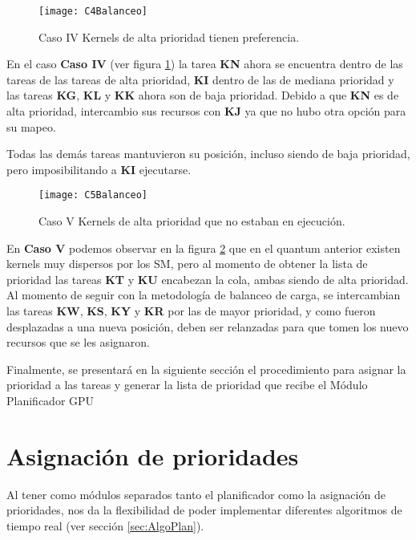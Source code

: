 \begin{figure}[h!]
  \centering
    \texttt{[image: C4Balanceo]}
    \caption{Caso IV Kernels de alta prioridad tienen preferencia.}
    \label{fig:C4Balanceo}
\end{figure}

En el caso \textbf{Caso IV} (ver figura \ref{fig:C4Balanceo}) la tarea \textbf{KN} ahora se encuentra dentro de las tareas de las tareas de alta prioridad, \textbf{KI} dentro de las de mediana prioridad y las tareas \textbf{KG}, \textbf{KL} y \textbf{KK} ahora son de baja prioridad. Debido a que \textbf{KN} es de alta prioridad, intercambio sus recursos con \textbf{KJ} ya que no hubo otra opción para su mapeo. 

Todas las demás tareas mantuvieron su posición, incluso siendo de baja prioridad, pero imposibilitando a \textbf{KI} ejecutarse.
\newline

\begin{figure}[h!]
      \centering
        \texttt{[image: C5Balanceo]}
        \caption{Caso V Kernels de alta prioridad que no estaban en ejecución.}
        \label{fig:C5Balanceo}
    \end{figure}

En \textbf{Caso V} podemos observar en la figura \ref{fig:C5Balanceo} que en el quantum anterior existen kernels muy dispersos por los SM, pero al momento de obtener la lista de prioridad las tareas \textbf{KT} y \textbf{KU} encabezan la cola, ambas siendo de alta prioridad. 
Al momento de seguir con la metodología de balanceo de carga, se intercambian las tareas \textbf{KW}, \textbf{KS}, \textbf{KY} y \textbf{KR} por las de mayor prioridad, y como fueron desplazadas a una nueva posición, deben ser relanzadas para que tomen los nuevo recursos que se les asignaron.  
\newline

Finalmente, se presentará en la siguiente sección el procedimiento para asignar la prioridad a las tareas y generar la lista de prioridad que recibe el Módulo Planificador GPU

\section{Asignación de prioridades} \label{secc:asigPrioridad}

Al tener como módulos separados tanto el planificador como la asignación de prioridades, nos da la flexibilidad de poder implementar diferentes algoritmos de tiempo real (ver sección \ref{sec:AlgoPlan}).
\newline


